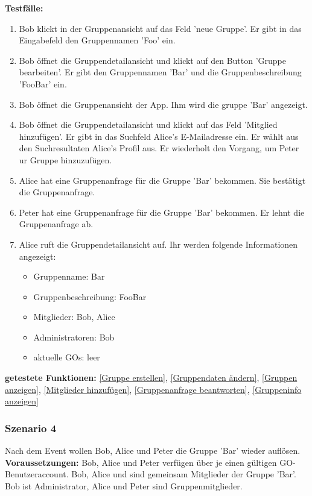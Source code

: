 \documentclass[parskip=full]{scrartcl}
\def\threedigits#1{%
  \ifnum#1<100 0\fi
  \ifnum#1<10 0\fi
  \number#1}
\begin{document}
\textbf{Testfälle:}
\begin{enumerate}[label={\textbf{/T\protect\threedigits{\theenumi}0/}}, leftmargin=*, resume]
	\item Bob klickt in der Gruppenansicht auf das Feld 'neue Gruppe'. Er gibt in das Eingabefeld den Gruppennamen 'Foo' ein.
	\item Bob öffnet die Gruppendetailansicht und klickt auf den Button 'Gruppe bearbeiten'. Er gibt den Gruppennamen 'Bar' und die Gruppenbeschreibung 'FooBar' ein.
	\item Bob öffnet die Gruppenansicht der App. Ihm wird die gruppe 'Bar' angezeigt.
	\item Bob öffnet die Gruppendetailansicht und klickt auf das Feld 'Mitglied hinzufügen'. Er gibt in das Suchfeld Alice's E-Mailadresse ein. Er wählt aus den Suchresultaten Alice's Profil aus. Er wiederholt den Vorgang, um Peter ur Gruppe hinzuzufügen.
	\item Alice hat eine Gruppenanfrage für die Gruppe 'Bar' bekommen. Sie bestätigt die Gruppenanfrage.
	\item Peter hat eine Gruppenanfrage für die Gruppe 'Bar' bekommen. Er lehnt die Gruppenanfrage ab.
	\item Alice ruft die Gruppendetailansicht auf. Ihr werden folgende Informationen angezeigt:
	\begin{itemize}
		\item Gruppenname: Bar
		\item Gruppenbeschreibung: FooBar
		\item Mitglieder: Bob, Alice
		\item Administratoren: Bob
		\item aktuelle GOs: leer
	\end{itemize}
\end{enumerate}

\textbf{getestete Funktionen: }\ref{Gruppe erstellen}, \ref{Gruppendaten ändern}, \ref{Gruppen anzeigen}, \ref{Mitglieder hinzufügen}, \ref{Gruppenanfrage beantworten}, \ref{Gruppeninfo anzeigen}

\subsubsection*{Szenario 4}Nach dem Event wollen Bob, Alice und Peter die Gruppe 'Bar' wieder auflösen.\\

\textbf{Voraussetzungen: }Bob, Alice und Peter verfügen über je einen gültigen GO-Benutzeraccount. Bob, Alice und sind gemeinsam Mitglieder der Gruppe 'Bar'. Bob ist Administrator, Alice und Peter sind Gruppenmitglieder.\\
\end{document}
